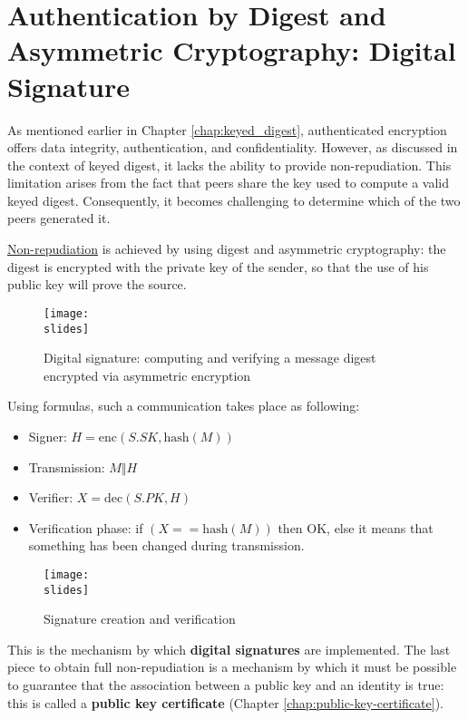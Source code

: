 \section{Authentication by Digest and Asymmetric Cryptography: Digital Signature}\label{chap:digital_signature}

As mentioned earlier in Chapter \ref{chap:keyed_digest}, authenticated encryption offers data integrity, authentication, and confidentiality. However, as discussed in the context of keyed digest, it lacks the ability to provide non-repudiation. This limitation arises from the fact that peers share the key used to compute a valid keyed digest. Consequently, it becomes challenging to determine which of the two peers generated it.

\underline{Non-repudiation} is achieved by using digest and asymmetric cryptography: the digest is encrypted with the private key of the sender, so that the use of his public key will prove the source.

\begin{figure}[h]
    \centering
    \texttt{[image: \\slides]}
    \caption{Digital signature: computing and verifying a
    message digest encrypted via asymmetric encryption}
\end{figure}

Using formulas, such a communication takes place as following:
\begin{itemize}
    \item Signer: $H = \text{enc}(S.SK, \text{hash}(M))$
    \item Transmission: $M \Vert H$
    \item Verifier: $X = \text{dec}(S.PK, H)$
    \item Verification phase: if $(X == \text{hash}(M))$ then OK, else it means that something has been changed during transmission.
\end{itemize}


\begin{figure}[h]
    \centering
    \texttt{[image: \\slides]}
    \caption{Signature creation and verification}
\end{figure}

This is the mechanism by which \textbf{digital signatures} are implemented. 
The last piece to obtain full non-repudiation is a mechanism by which it must be possible to guarantee that the association between a public key and an identity is true: 
this is called a \textbf{public key certificate} (Chapter \ref{chap:public-key-certificate}).

